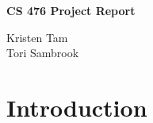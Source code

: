 \documentclass[onecolumn,journal,12pt]{article}
\begin{document}
\begin{titlepage}

    \centering
    \vspace*{3cm}
    \huge\bfseries
    CS 476 Project Report
    \vspace{1cm}
   
    \large Kristen Tam \\ 
    \vspace{0.1cm}
    \large Tori Sambrook
    \vfill

\end{titlepage}

\newpage
\tableofcontents

\newpage
\section{Introduction}
\end{document}
